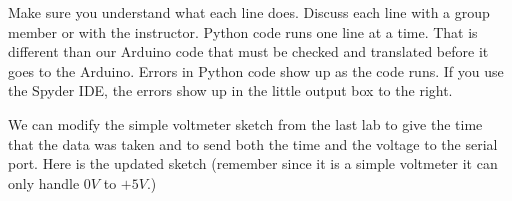 % 
% 
% 
%    
%         
%    

Make sure you understand what each line does. Discuss each line with a group
member or with the instructor. Python code runs one line at a time. That is
different than our Arduino code that must be checked and translated before
it goes to the Arduino. Errors in Python code show up as the code runs. If
you use the Spyder IDE, the errors show up in the little output box to the
right.

We can modify the simple voltmeter sketch from the last lab
to give the time that the data was taken and
to send both the time and the voltage to the serial port. Here is the
updated sketch
(remember since it is a simple voltmeter it can only handle $0\unit{V}$ to $%
+5\unit{V}.$)


